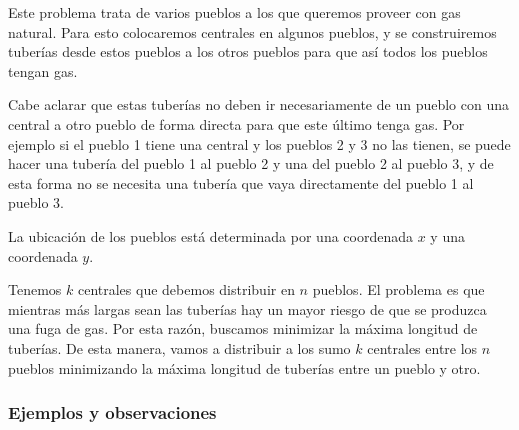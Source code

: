 Este problema trata de varios pueblos a los que queremos proveer con gas natural. Para esto colocaremos centrales en algunos pueblos, y se construiremos tuberías desde estos pueblos a los otros pueblos para que así todos los pueblos tengan gas. 

Cabe aclarar que estas tuberías no deben ir necesariamente de un pueblo con una central a otro pueblo de forma directa para que este último tenga gas. Por ejemplo si el pueblo 1 tiene una central y los pueblos 2 y 3 no las tienen, se puede hacer una tubería del pueblo 1 al pueblo 2 y una del pueblo 2 al pueblo 3, y de esta forma no se necesita una tubería que vaya directamente del pueblo 1 al pueblo 3.

La ubicación de los pueblos está determinada por una coordenada $x$ y una coordenada $y$.

Tenemos $k$ centrales que debemos distribuir en $n$ pueblos. El problema es que mientras más largas sean las tuberías hay un mayor riesgo de que se produzca una fuga de gas. Por esta razón, buscamos minimizar la máxima longitud de tuberías. De esta manera, vamos a distribuir a los sumo $k$ centrales entre los $n$ pueblos minimizando la máxima longitud de tuberías entre un pueblo y otro.

\subsubsection{Ejemplos y observaciones}

